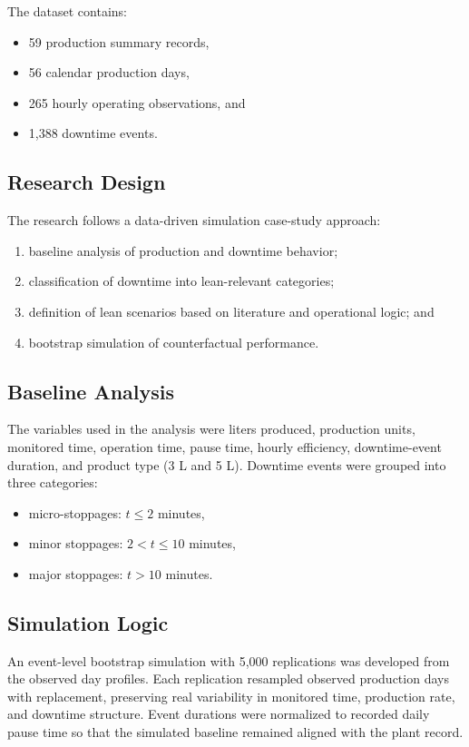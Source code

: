 \documentclass[journal]{IEEEtran}
\begin{document}
The dataset contains:
\begin{itemize}
    \item 59 production summary records,
    \item 56 calendar production days,
    \item 265 hourly operating observations, and
    \item 1,388 downtime events.
\end{itemize}

\subsection{Research Design}
The research follows a data-driven simulation case-study approach:
\begin{enumerate}
    \item baseline analysis of production and downtime behavior;
    \item classification of downtime into lean-relevant categories;
    \item definition of lean scenarios based on literature and operational logic; and
    \item bootstrap simulation of counterfactual performance.
\end{enumerate}

\subsection{Baseline Analysis}
The variables used in the analysis were liters produced, production units, monitored time, operation time, pause time, hourly efficiency, downtime-event duration, and product type (3 L and 5 L). Downtime events were grouped into three categories:
\begin{itemize}
    \item micro-stoppages: $t \leq 2$ minutes,
    \item minor stoppages: $2 < t \leq 10$ minutes,
    \item major stoppages: $t > 10$ minutes.
\end{itemize}

\subsection{Simulation Logic}
An event-level bootstrap simulation with 5,000 replications was developed from the observed day profiles. Each replication resampled observed production days with replacement, preserving real variability in monitored time, production rate, and downtime structure. Event durations were normalized to recorded daily pause time so that the simulated baseline remained aligned with the plant record.
\end{document}
